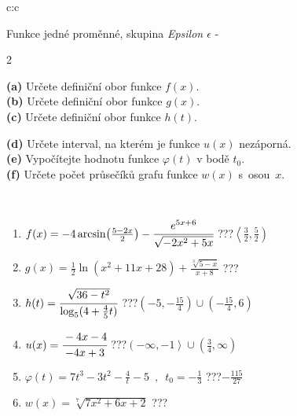 \documentclass[10pt]{report}
\begin{document}
\begin{tabular}{c:c}
\begin{minipage}[c][104.5mm][t]{0.5\linewidth}
\begin{center}
{\huge Funkce jedné proměnné, skupina \textit{Epsilon $\epsilon$} -}\\[5mm]
\begin{minipage}{0.95\linewidth}
\begin{center}
{\small \begin{multicols}{2} \raggedright
\textbf{(a)} Určete definiční obor funkce \(f(x)\). \\[1mm]
\textbf{(b)} Určete definiční obor funkce \(g(x)\). \\[1mm]
\textbf{(c)} Určete definiční obor funkce \(h(t)\). \par \columnbreak
\textbf{(d)} Určete interval, na kterém je funkce \(u(x)\) nezáporná. \\[1mm]
\textbf{(e)} Vypočítejte hodnotu funkce \(\varphi(t)\) v bodě \(t_0\). \\[1mm]
\textbf{(f)} Určete počet průsečíků grafu funkce \(w(x)\) s~osou~\(x\). \\[1mm]
\end{multicols}
}
\end{center}
\end{minipage}
\\[4mm]
\begin{minipage}{0.79\linewidth}
\begin{center}
\begin{varwidth}{\linewidth}
\begin{enumerate}
\small
\item $f(x) = -4\arcsin\!\left( \frac{5-2x}{2} \right) - \cfrac{e^{5x+6}}{\sqrt{-2x^2+5x}}$\quad \dotfill\; ???\;\dotfill \quad $\left\langle\frac{3}{2} , \frac{5}{2}\right)$
\item $g(x) = \frac{1}{2} \ln{\!(x^2+11x+28)}+\frac{\sqrt[3]{5-x}}{x+8}$\quad \dotfill\; ???\;\dotfill {}
\item $h(t) = \cfrac{\sqrt{36-t^2}}{\log_5(4+\frac{4}{5}t)}$\quad \dotfill\; ???\;\dotfill \quad $\left(-5 , -\frac{15}{4}\right)\cup\left(-\frac{15}{4} , 6\right)$
\item $u(x) = \cfrac{-4x-4}{-4x+3}$\quad \dotfill\; ???\;\dotfill \quad $\left(-\infty , -1\right\rangle\cup\left(\frac{3}{4} , \infty\right)$
\item $\varphi(t) = 7t^3-3t^2-\frac{4}{t}-5 \enspace , \enspace t_0=-\frac{1}{3}$\quad \dotfill\; ???\;\dotfill \quad $-\frac{115}{27}$
\item $w(x) = \sqrt[7]{7x^2+6x+2}$\quad \dotfill\; ???\;\dotfill {}

\end{enumerate}
\end{varwidth}
\end{center}
\end{minipage}
\end{center}
\end{minipage}
\end{tabular}
\end{document}
